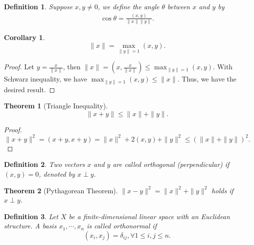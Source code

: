 \documentclass[11pt]{book}
\newtheorem{definition}{Definition}[section]
\newtheorem{theorem}{Theorem}[section]
\newtheorem{corollary}{Corollary}[section]
\theoremstyle{definition}
\numberwithin{equation}{subsection}
\begin{document}
\medskip

\begin{definition}
Suppose $x,y\neq 0$, we define the angle $\theta$ between $x$ and $y$ by
\begin{align*}
    \cos \theta = \frac{(x,y)}{\|x\| \|y\|}.
\end{align*}
\end{definition}

\medskip

\begin{corollary}
$$\|x\| = \max_{\|y\| = 1} (x,y).$$
\end{corollary}
\begin{proof}
Let $y = \frac{x}{\|x\|}$, then $\|x\| = \left(x, \frac{x}{\|x\|}\right) \leq \max_{\|y\| = 1} (x,y)$. With Schwarz inequality, we have $\max_{\|y\| = 1} (x,y) \leq \|x\|$. Thus, we have the desired result.
\end{proof}

\medskip

\begin{theorem}[Triangle Inequality]
$$\|x+y\|\leq \|x\| + \|y\|.$$
\end{theorem}
\begin{proof}
$$\|x+y\|^2 = (x+y, x+y) = \|x\|^2 + 2(x,y) + \|y\|^2 \leq (\|x\| + \|y\|)^2.$$
\end{proof}

\medskip

\begin{definition}
Two vectors $x$ and $y$ are called orthogonal (perpendicular) if $(x,y) = 0$, denoted by $x \perp y$.
\end{definition}

\medskip

\begin{theorem}[Pythagorean Theorem]
$\|x-y\|^2 = \|x\|^2 + \|y\|^2$ holds if $x \perp y$.
\end{theorem}

\medskip

\begin{definition}
Let $X$ be a finite-dimensional linear space with an Euclidean structure. A basis $x_1, \cdots, x_n$ is called orthonormal if 
$$(x_i, x_j) = \delta_{ij}, \forall 1\leq i,j\leq n.$$
\end{definition}

\medskip
\end{document}
